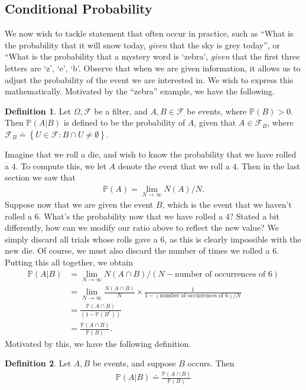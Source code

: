 \documentclass[12pt]{article}
\newcommand{\filter}{\mathcal{F}}
\newcommand{\prob}{\mathbb{P}}
\theoremstyle{plain}
\theoremstyle{definition}
\newtheorem*{definition}{Definition}
\theoremstyle{remark}
\numberwithin{equation}{section}  %
\begin{document}
\subsection{Conditional Probability}
We now wish to tackle statement that often occur in practice,
such as ``What is the probability that it will snow today, \emph{given}
that the sky is grey today'', or ``What is the probability that a mystery word
is `zebra', \emph{given} that the first three letters are
`z', `e', `b'.
Observe that when we are given information, it allows us to adjust the
probability of the event we are interested in. We wish to express this
mathematically. Motivated by the ``zebra'' example, we have the following.
\begin{definition}
    Let $\Omega, \filter$ be a filter, and $A, B \in \filter$ be events, where
    $\prob(B) > 0$. Then $\prob(A | B)$ is defined to be the probability of $A$, given that $A \in \filter_B$, where $\filter_B
    \doteq \left\{ U \in \filter: B \cap U \neq \emptyset \right\}$.
\end{definition}
Imagine that we roll a die, and wish to know the probability that
we have rolled a $4$.
To compute this, we let $A$ denote the event that we roll a $4$. Then in the last section we saw
that
\begin{align*}
    \prob(A) = \lim_{N \to \infty} N(A)/N.
\end{align*}
Suppose now that we are given the event $B$, which is the event that we haven't
rolled a $6$.
What's the probability now that we have rolled a $4$?
Stated a bit differently, how can we modify our ratio above to reflect the
new value? We simply discard all trials whose rolls gave a $6$, as this is clearly
impossible with the new die. Of course, we must also discard the number of times
we rolled a $6$. Putting this all together, we obtain
\begin{align*}
    \prob(A | B) & = \lim_{N \to \infty} N(A \cap B)/(N -
    \text{number of occurrences of $6$})
    \\
    & = \lim_{N \to \infty} \frac{N(A \cap B)}{N}
    \times \frac{1}{1 - (\text{number of occurrences of $6$})/N}
    \\
    & = \frac{\prob(A \cap B)}{(1 - \prob(B^c))}
    \\
    & = \frac{\prob(A \cap B)}{\prob(B)}.
\end{align*}
Motivated by this, we have the following definition.
\begin{definition}
    Let $A, B$ be events, and suppose $B$ occurs. Then
    \begin{align*}
        \prob(A | B) \doteq \frac{\prob(A \cap B)}{\prob(B)}
    \end{align*}
\end{definition}
\end{document}
